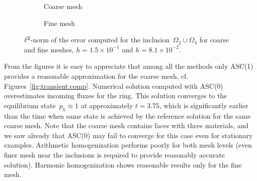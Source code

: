 
	\begin{figure}[h]
		\centering
		\begin{subfigure}{.8\linewidth}
			\centering
			\caption{Coarse mesh}
		\end{subfigure}%
		\par
		\begin{subfigure}{.8\linewidth}
			\centering
			\caption{Fine mesh}	
		\end{subfigure}%
		\caption{${\ell^2}$-norm of the error computed for the inclusion~$\Omega_2 \cup \Omega_3$ for coarse and fine meshes, $h = 1.5 \times 10^{-1}$ and $h = 8.1 \times 10^{-2}$. \label{fig:transient:err}}
	\end{figure}

	From the figures it is easy to appreciate  that among all the methods only  ASC(1)  provides a reasonable approximation for the coarse mesh, cf. Figures~\ref{fig:transient:comp}.
        Numerical solution computed with ASC(0)  overestimates incoming fluxes  for the ring.  This solution converges to the equilibrium state~$p_h \approx 1$ at approximately $t = 3.75$, which is significantly earlier than the time when same state is achieved by the reference solution  for the same coarse mesh. Note that the coarse mesh contains faces with three materials, and we saw already that ASC(0) may fail to converge for this case even for stationary examples\footnotemark{}.
	Arithmetic homogenization performs poorly for both mesh levels (even finer mesh near the inclusions is required to provide reasonably accurate solution). Harmonic homogenization shows reasonable results only for the fine mesh.

